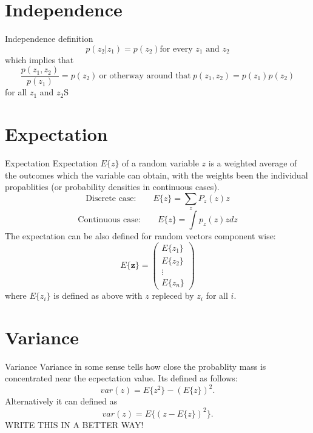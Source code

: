 \documentclass{beamer}
\begin{document}
\section{Independence}

\begin{frame}{Independence}
  definition
  \[
  p(z_2|z_1) = p(z_2) \text{for every $z_1$ and $z_2$}
  \]
  which implies that
  \[
  \frac{p(z_1, z_2)}{p(z_1)} = p(z_2) \ \text{or otherway around that} \ p(z_1, z_2) = p(z_1)p(z_2)
  \]
  for all $z_1$ and $z_2$S
\end{frame}

\section{Expectation}

\begin{frame}{Expectation}
  Expectation $E\{z\}$ of a random variable $z$ is a weighted average of the
  outcomes which the variable can obtain, with the weights been the individual
  propablities (or probability densities in continuous cases).
  \[
  \text{Discrete case:} \qquad
  E\{z\} = \sum_{z} P_{z}(z)z
  \]
  \[
  \text{Continuous case:} \qquad
  E\{z\} = \int p_{z}(z)zdz
  \]
  The expectation can be also defined for random vectors component wise:
  \[
  E\{\mathbf{z}\} =
  \begin{pmatrix} E\{z_1\} \\ E\{z_2\} \\ \vdots \\ E\{z_n\} \end{pmatrix}
  \]
  where $E\{z_i\}$ is defined as above with $z$ repleced by $z_i$ for all $i$.
\end{frame}

\section{Variance}

\begin{frame}{Variance}
  Variance in some sense tells how close the probablity mass is concentrated
  near the ecpectation value. Its defined as follows:
  \[
  var(z)= E\{z^2\}-(E\{z\})^2.
  \]
  Alternatively it can defined as
  \[
   var(z) = E\{(z-E\{z\})^2\}.
  \]
  WRITE THIS IN A BETTER WAY!

\end{frame}
\end{document}
